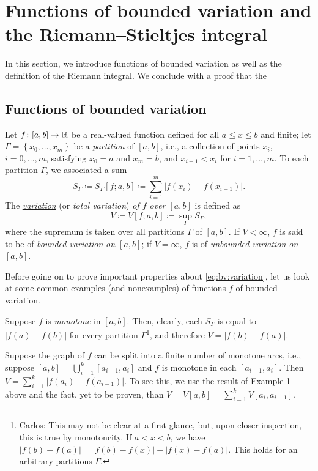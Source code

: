 \section{Functions of bounded variation and the Riemann--Stieltjes
  integral}
In this section, we introduce functions of bounded variation as well as the
definition of the Riemann integral. We conclude with a proof that the

\subsection{Functions of bounded variation}
Let $f\colon[a,b]\to\mathbb{R}$ be a real-valued function defined for all $a\leq
x\leq b$ and finite; let $\Gamma=\left\{x_0,\dotsc,x_m\right\}$ be a
\href{https://en.wikipedia.org/wiki/Partition_of_an_interval}{\emph{partition}}
of $[a,b]$, i.e., a collection of points $x_i$, $i=0,\dotsc,m$, satisfying
$x_0=a$ and $x_m=b$, and $x_{i-1}<x_i$ for $i=1,\dotsc,m$. To each
partition $\Gamma$, we associated a sum
\begin{equation}
\label{eq:bv:sum}
S_\Gamma\coloneqq S_\Gamma[f;a,b]\coloneqq\sum_{i=1}^m\left|f(x_i)-f(x_{i-1})\right|.
\end{equation}
The
\href{https://en.wikipedia.org/wiki/Bounded_variation#Formal_definition}{\emph{variation}}
(or \emph{total variation}) \emph{of $f$ over $[a,b]$} is defined as
\begin{equation}
  \label{eq:bv:variation}
V\coloneqq V[f;a,b]\coloneqq\sup_\Gamma S_\Gamma,
\end{equation}
where the supremum is taken over all partitions $\Gamma$ of $[a,b]$. If
$V<\infty$, $f$ is said to be of
\href{https://en.wikipedia.org/wiki/Bounded_variation}{\emph{bounded
    variation}} \emph{on $[a,b]$}; if $V=\infty$, $f$ is of \emph{unbounded
variation on $[a,b]$}.

Before going on to prove important properties about
\eqref{eq:bv:variation}, let us look at some common examples (and
nonexamples) of functions $f$ of bounded variation.

\begin{example}
Suppose $f$ is
\href{https://en.wikipedia.org/wiki/Monotonic_function}{\emph{monotone}} in
$[a,b]$. Then, clearly, each $S_\Gamma$ is equal to $|f(a)-f(b)|$ for every
partition $\Gamma$\footnote{Carlos: This may not be clear at
  a first glance, but, upon closer inspection, this is true by
  monotoncity. If $a<x<b$, we have
  $|f(b)-f(a)|=|f(b)-f(x)|+|f(x)-f(a)|$. This holds for an arbitrary
  partitions $\Gamma$.}, and therefore $V=|f(b)-f(a)|$.
\end{example}
\begin{example}
Suppose the graph of $f$ can be split into a finite number of monotone
arcs, i.e., suppose $[a,b]=\bigcup_{i=1}^k [a_{i-1},a_i]$ and $f$ is
monotone in each $[a_{i-1},a_i]$. Then
$V=\sum_{i-1}^k|f(a_i)-f(a_{i-1})|$. To see this, we use the result of
Example 1 above and the fact, yet to be proven, than $V=V[a,b]=\sum_{i=1}^k
V[a_i,a_{i-1}]$.
\end{example}

